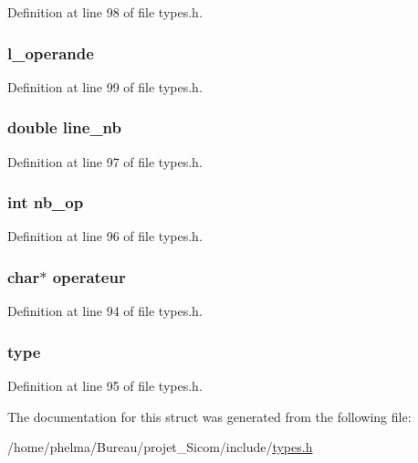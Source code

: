 Definition at line 98 of file types.\-h.

\hypertarget{struct__bss___acdac487d99d10dba873a0f07707b220f}{
\subsubsection[{l\-\_\-operande}]{ l\-\_\-operande}}\label{struct__bss___acdac487d99d10dba873a0f07707b220f}


Definition at line 99 of file types.\-h.

\hypertarget{struct__bss___a808a37180ef5a21555b2f0f68cf73cb6}{
\subsubsection[{line\-\_\-nb}]{\setlength{\rightskip}{0pt plus 5cm}double line\-\_\-nb}}\label{struct__bss___a808a37180ef5a21555b2f0f68cf73cb6}


Definition at line 97 of file types.\-h.

\hypertarget{struct__bss___a88a29c0db6a919d126d1c94d573dd711}{
\subsubsection[{nb\-\_\-op}]{\setlength{\rightskip}{0pt plus 5cm}int nb\-\_\-op}}\label{struct__bss___a88a29c0db6a919d126d1c94d573dd711}


Definition at line 96 of file types.\-h.

\hypertarget{struct__bss___adc2a267b945f31e8e0dad4b528128cab}{
\subsubsection[{operateur}]{\setlength{\rightskip}{0pt plus 5cm}char$\ast$ operateur}}\label{struct__bss___adc2a267b945f31e8e0dad4b528128cab}


Definition at line 94 of file types.\-h.

\hypertarget{struct__bss___aad08bab2b3236673ec49e299ca32a07e}{
\subsubsection[{type}]{ type}}\label{struct__bss___aad08bab2b3236673ec49e299ca32a07e}


Definition at line 95 of file types.\-h.



The documentation for this struct was generated from the following file\-:\begin{DoxyCompactItemize}
\item 
/home/phelma/\-Bureau/projet\-\_\-\-Sicom/include/\hyperlink{types_8h}{types.\-h}\end{DoxyCompactItemize}
